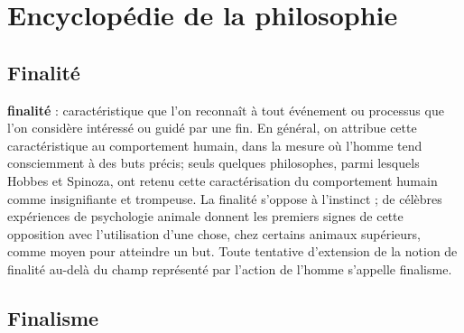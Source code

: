 
\section{Encyclopédie de la philosophie}
%
\subsection{Finalité}

{\bf finalité} : caractéristique que l’on reconnaît
à tout événement ou processus que l’on
considère intéressé ou guidé par une fin.
En général, on attribue cette caractéristique au comportement humain, dans la
mesure où l’homme tend consciemment à
des buts précis; seuls quelques philosophes, parmi lesquels Hobbes et Spinoza, ont retenu cette caractérisation du
comportement humain comme insignifiante et trompeuse. La finalité s'oppose
à l’instinct ; de célèbres expériences de
psychologie animale donnent les premiers
signes de cette opposition avec l’utilisation d’une chose, chez certains animaux
supérieurs, comme moyen pour atteindre
un but. Toute tentative d’extension de la
notion de finalité au-delà du champ
représenté par l’action de l’homme s’appelle finalisme.

\subsection{Finalisme}

